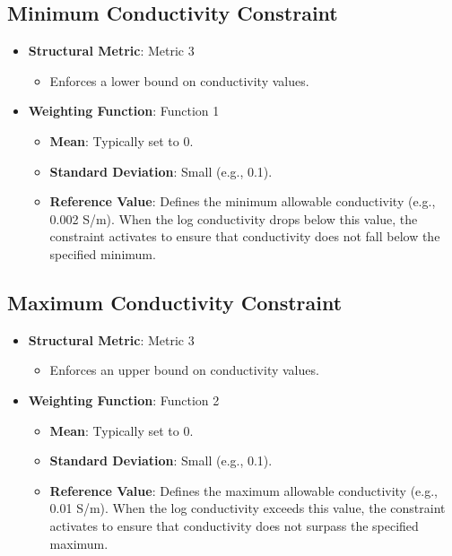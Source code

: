 \documentclass[a4paper,12pt]{article}
\begin{document}
\subsection{Minimum Conductivity Constraint}
\begin{itemize}
    \item \textbf{Structural Metric}: Metric 3
          \begin{itemize}
              \item Enforces a lower bound on conductivity values.
          \end{itemize}
    \item \textbf{Weighting Function}: Function 1
          \begin{itemize}
              \item \textbf{Mean}: Typically set to 0.
              \item \textbf{Standard Deviation}: Small (e.g., 0.1).
              \item \textbf{Reference Value}: Defines the minimum allowable conductivity (e.g., 0.002 S/m). When the log conductivity drops below this value, the constraint activates to ensure that conductivity does not fall below the specified minimum.
          \end{itemize}
\end{itemize}

\subsection{Maximum Conductivity Constraint}
\begin{itemize}
    \item \textbf{Structural Metric}: Metric 3
          \begin{itemize}
              \item Enforces an upper bound on conductivity values.
          \end{itemize}
    \item \textbf{Weighting Function}: Function 2
          \begin{itemize}
              \item \textbf{Mean}: Typically set to 0.
              \item \textbf{Standard Deviation}: Small (e.g., 0.1).
              \item \textbf{Reference Value}: Defines the maximum allowable conductivity (e.g., 0.01 S/m). When the log conductivity exceeds this value, the constraint activates to ensure that conductivity does not surpass the specified maximum.
          \end{itemize}
\end{itemize}
\end{document}
